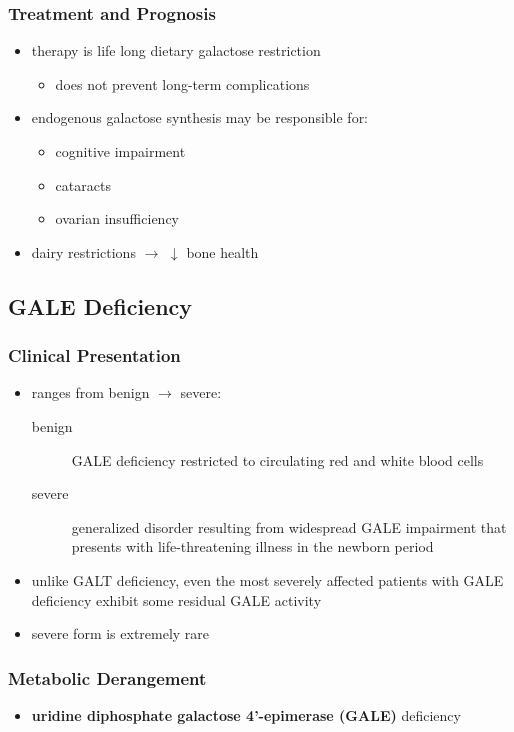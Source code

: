 \documentclass[12pt]{scrartcl}
\begin{document}
\subsubsection{Treatment and Prognosis}
\label{sec:org96a212d}
\begin{itemize}
\item therapy is life long dietary galactose restriction
\begin{itemize}
\item does not prevent long-term complications
\end{itemize}
\item endogenous galactose synthesis may be responsible for:
\begin{itemize}
\item cognitive impairment
\item cataracts
\item ovarian insufficiency
\end{itemize}
\item dairy restrictions \(\to\) \(\downarrow\) bone health
\end{itemize}

\subsection{GALE Deficiency}
\label{sec:org6b08613}
\subsubsection{Clinical Presentation}
\label{sec:org5817203}
\begin{itemize}
\item ranges from benign \(\to\) severe:
\begin{description}
\item[{benign}] GALE deficiency restricted to circulating red and white blood cells
\item[{severe}] generalized disorder resulting from widespread GALE
impairment that presents with life-threatening illness
in the newborn period
\end{description}
\item unlike GALT deficiency, even the most severely affected patients
with GALE deficiency exhibit some residual GALE activity
\item severe form is extremely rare
\end{itemize}

\subsubsection{Metabolic Derangement}
\label{sec:org311484a}
\begin{itemize}
\item \textbf{uridine diphosphate galactose 4’-epimerase (GALE)} deficiency
\end{itemize}
\end{document}
